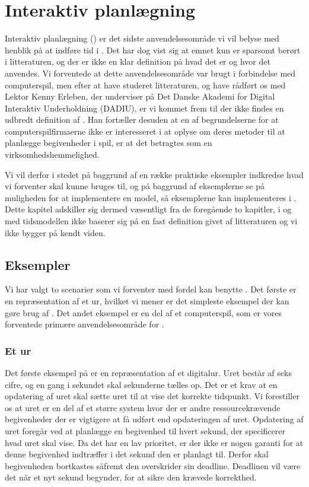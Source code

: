 \chapter{Interaktiv planlægning}
\label{chap:is}
Interaktiv planlægning (\is) er det sidste anvendelsesområde vi vil belyse med henblik på at indføre tid i \pycsp. Det har dog vist sig at emnet kun er sparsomt berørt i litteraturen, og der er ikke en klar definition på hvad det er og hvor det anvendes. 
Vi forventede at dette anvendelsesområde var brugt i forbindelse med computerspil, men efter at have studeret litteraturen, og have rådført os med Lektor Kenny Erleben, der underviser på Det Danske Akademi for Digital Interaktiv Underholdning (DADIU), er vi kommet frem til der ikke findes en udbredt definition af \is. Han fortæller desuden at en af begrundelserne for at computerspilfirmaerne ikke er interesseret i at oplyse om deres metoder til at planlægge begivenheder i spil, er at det  betragtes som en  virksomhedshemmelighed. 

Vi vil derfor i stedet på baggrund af en række praktiske eksempler indkredse hvad vi forventer \is skal kunne bruges til, og på baggrund af eksemplerne se på muligheden for at implementere en model, så eksemplerne kan implementeres i \pycsp. Dette kapitel adskiller sig dermed væsentligt fra de foregående to kapitler, i og med tidsmodellen ikke baserer sig på en fast definition givet af litteraturen og vi ikke bygger på kendt viden.

\section{Eksempler}
Vi har valgt to scenarier som vi forventer med fordel kan benytte \is. Det første er en repræsentation af et ur, hvilket vi mener er det simpleste eksempel der kan gøre brug af \is. Det andet eksempel er en del af et computerspil, som er vores forventede primære anvendelsesområde for \is. 

\subsection{Et ur}
Det første eksempel på \is er en repræsentation af et digitalur. Uret består af seks cifre, og en gang i sekundet skal sekunderne tælles op. Det er et  krav at en opdatering af uret skal sætte uret til at vise det korrekte tidspunkt. Vi forestiller os at uret er en del af et større system hvor der er andre ressourcekrævende begivenheder der er vigtigere at få udført end opdateringen af uret. Opdatering af uret foregår ved at planlægge en begivenhed til hvert sekund, der specificerer hvad uret skal vise. Da det har en lav prioritet, er der ikke er nogen garanti for at denne begivenhed indtræffer i det sekund den er planlagt til. Derfor skal begivenheden  bortkastes såfremt den overskrider sin deadline. Deadlinen vil være det når et nyt sekund begynder, for at sikre den krævede korrekthed. 


